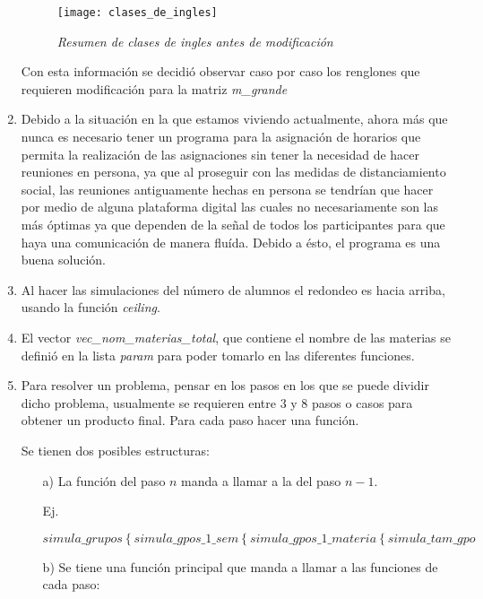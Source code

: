 \begin{enumerate}
\begin{figure}[H]
\centering
\texttt{[image: clases\_de\_ingles]} %
\caption{\textit{Resumen de clases de ingles antes de modificación}}
\end{figure}  
  
Con esta información se decidió observar caso por caso los renglones que requieren modificación para la matriz \textit{m\_grande}


  \item Debido a la situación en la que estamos viviendo actualmente, ahora más que nunca es necesario tener un programa para la asignación de horarios que permita la realización de las asignaciones sin tener la necesidad de hacer reuniones en persona, ya que al proseguir con las medidas de distanciamiento social, las reuniones antiguamente hechas en persona se tendrían que hacer por medio de alguna plataforma digital las cuales no necesariamente son las más óptimas ya que dependen de la señal de todos los participantes para que haya una comunicación de manera fluída. Debido a ésto, el programa es una buena solución.

  \item Al hacer las simulaciones del número de alumnos el redondeo es hacia arriba, usando la función \textit{ceiling}.
  
  \item El vector \textit{vec\_nom\_materias\_total}, que contiene el nombre de las materias se definió en la lista \textit{param} para poder tomarlo en las diferentes funciones.
  
  \item Para resolver un problema, pensar en los pasos en los que se puede dividir dicho problema, usualmente se requieren entre 3 y 8 pasos o casos para obtener un producto final. Para cada paso hacer una función. 
  
  Se tienen dos posibles estructuras:
  
  \begin{itemize}
  \item[a)] La función del paso $n$ manda a llamar a la del paso $n-1$.
  
  Ej.

  $\textit{simula\_grupos} \left\{ \textit{simula\_gpos\_1\_sem}\right. \left\{ \textit{simula\_gpos\_1\_materia}\right. \left\{ \textit{simula\_tam\_gpo}\right.$\\
  
  \item[b)] Se tiene una función principal que manda a llamar a las funciones de cada paso:
  

\end{itemize}
\end{enumerate}

